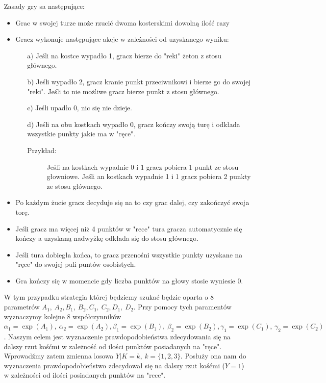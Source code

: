 \documentclass[inzynierska]{pwr_wmat_praca_dyplomowa}
\theoremstyle{plain}
\numberwithin{theorem}{chapter}
\theoremstyle{definition}
\numberwithin{theorem}{chapter}
\begin{document}
	Zasady gry sa następujące:
	\begin{itemize}[]
		\item Grac w swojej turze może rzucić dwoma kosterskimi dowolną ilość razy
		\item  Gracz wykonuje następujące akcje w zależności od uzyskanego wyniku:
		\begin{enumerate}
			\item[a)] Jeśli na kostce wypadło 1, gracz bierze do "reki" żeton z stosu głównego.
			\item[b)] Jeśli wypadło 2, gracz kranie punkt przeciwnikowi i bierze go do swojej "reki". Jeśli to nie możliwe gracz bierze punkt z stosu głównego. 
			\item[c)] Jeśli upadło 0, nic się nie dzieje.
			\item[d)] Jeśli na obu kostkach wypadło 0, gracz kończy swoją turę i odkłada wszystkie punkty jakie ma w "ręce".
			\begin{description}
				\item[Przykład:] Jeśli na kostkach wypadnie 0 i 1 gracz pobiera 1 punkt ze stosu głowniowe. Jeśli an kostkach wypadnie 1 i 1 gracz pobiera 2 punkty ze stosu głównego. 
			\end{description}		
		\end{enumerate}
		\item Po każdym żucie gracz decyduje się na to czy grac dalej, czy zakończyć swoja torę.
		
		\item Jeśli gracz ma więcej niż 4 punktów w "rece" tura gracza automatycznie się kończy a uzyskaną nadwyżkę odkłada się do stosu głównego.
		
		\item Jeśli tura dobiegła końca, to gracz przenośni wszystkie punkty uzyskane na "ręce" do swojej puli puntów osobistych.
		
		\item Gra kończy się w momencie gdy liczba punktów na głowy stosie wyniesie 0.
	\end{itemize}

		W tym przypadku strategia której będziemy szukać będzie oparta o 8 parametrów $A_1,\: A_2, B_1,\: B_2, C_1,\: C_2, D_1,\: D_2$. Przy pomocy tych paramentów wyznaczymy kolejne 8 współczynników 
		$
		\alpha_1 = \exp(A_1),\:
		\alpha_2 = \exp(A_2), 
		\beta_1= \exp(B_1),\: 
		\beta_2= \exp(B_2), 
		\gamma_1= \exp(C_1),\: 
		\gamma_2= \exp(C_2)
		$. Naszym celem jest wyznaczenie prawdopodobieństwa zdecydowania się na dalszy rzut kośćmi w zależność od ilości punktów posiadanych na "ręce". Wprowadźmy zatem  zmienna losowa $Y|K=k,\: k=\{1, 2, 3\}$. Posłuży ona  nam do wyznaczenia prawdopodobieństwo zdecydował się na dalszy rzut kośćmi ($Y=1$) w zależności od ilości posiadanych punktów na "rece". 
		
\end{document}
